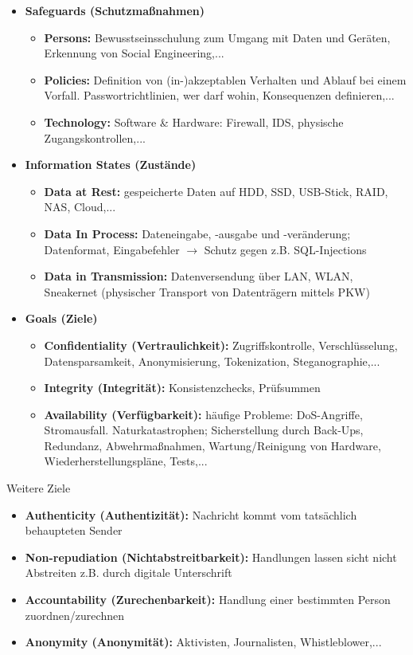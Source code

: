 \begin{itemize}
	\item \textbf{Safeguards (Schutzmaßnahmen)}
	\begin{itemize}
		\item \textbf{Persons:} Bewusstseinsschulung zum Umgang mit Daten und Geräten, Erkennung von Social Engineering,...
		\item \textbf{Policies:} Definition von (in-)akzeptablen Verhalten und Ablauf bei einem Vorfall. Passwortrichtlinien, wer darf wohin, Konsequenzen definieren,...
		\item \textbf{Technology:} Software \& Hardware: Firewall, IDS, physische Zugangskontrollen,...
	\end{itemize}
	\item \textbf{Information States (Zustände)}
	\begin{itemize}
		\item \textbf{Data at Rest:} gespeicherte Daten auf HDD, SSD, USB-Stick, RAID, NAS, Cloud,...
		\item \textbf{Data In Process:} Dateneingabe, -ausgabe und -veränderung; Datenformat, Eingabefehler $\rightarrow$ Schutz gegen z.B. SQL-Injections
		\item \textbf{Data in Transmission:} Datenversendung über LAN, WLAN, Sneakernet (physischer Transport von Datenträgern mittels PKW)
	\end{itemize}
	\item \textbf{Goals (Ziele)}
	\begin{itemize}
		\item \textbf{Confidentiality (Vertraulichkeit):} Zugriffskontrolle, Verschlüsselung, Datensparsamkeit, Anonymisierung, Tokenization, Steganographie,...
		\item \textbf{Integrity (Integrität):} Konsistenzchecks, Prüfsummen
		\item \textbf{Availability (Verfügbarkeit):} häufige Probleme: DoS-Angriffe, Stromausfall. Naturkatastrophen; Sicherstellung durch Back-Ups, Redundanz, Abwehrmaßnahmen, Wartung/Reinigung von Hardware, Wiederherstellungspläne, Tests,...
	\end{itemize}
\end{itemize}

Weitere Ziele
\begin{itemize}
	\item \textbf{Authenticity (Authentizität):} Nachricht kommt vom tatsächlich behaupteten Sender
	\item \textbf{Non-repudiation (Nichtabstreitbarkeit):} Handlungen lassen sicht nicht Abstreiten z.B. durch digitale Unterschrift
	\item \textbf{Accountability (Zurechenbarkeit):} Handlung einer bestimmten Person zuordnen/zurechnen
	\item \textbf{Anonymity (Anonymität):} Aktivisten, Journalisten, Whistleblower,...
\end{itemize}








